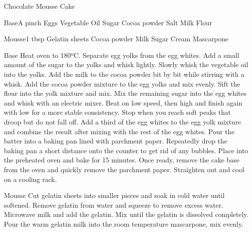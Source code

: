 \documentclass[10pt, a4paper]{article}
\begin{document}
	\begin{recipe}{Chocolate Mousse Cake}
		\begin{ingredients}[2]
			\begin{ingredientgroup}{Base}{A pinch}
				 Eggs
				 Vegetable Oil
				 Sugar
				 Cocoa powder
				 Salt
				 Milk
				 Flour
			\end{ingredientgroup}
			\begin{ingredientgroup}{Mousse}{1 tbsp}
				 Gelatin sheets
				 Cocoa powder
				 Milk
				 Sugar
				 Cream
				 Mascarpone
			\end{ingredientgroup}
		\end{ingredients}
		\begin{procedure}
			\begin{proceduregroup}{Base}
				\step Heat oven to 180ºC.
				\step Separate egg yolks from the egg whites.
				\step Add a small amount of the sugar to the yolks and whisk lightly.
				\step Slowly whisk the vegetable oil into the yolks.
				\step Add the milk to the cocoa powder bit by bit while stirring with a whisk.
				\step Add the cocoa powder mixture to the egg yolks and mix evenly.
				\step Sift the flour into the yolk mixture and mix.
				\step Mix the remaining sugar into the egg whites and whisk with an electric mixer. Beat on low speed, then high and finish again with low for a more stable consistency. Stop when you reach soft peaks that droop but do not fall off.
				\step Add a third of the egg whites to the egg yolk mixture and combine the result after mixing with the rest of the egg whites.
				\step Pour the batter into a baking pan lined with parchment paper. Repeatedly drop the baking pan a short distance onto the counter to get rid of any bubbles.
				\step Place into the preheated oven and bake for 15 minutes.
				\step Once ready, remove the cake base from the oven and quickly remove the parchment paper. Straighten out and cool on a cooling rack.
			\end{proceduregroup}
			\begin{proceduregroup}{Mousse}
				\step Cut gelatin sheets into smaller pieces and soak in cold water until softened.
				\step Remove gelatin from water and squeeze to remove excess water.
				\step Microwave milk and add the gelatin. Mix until the gelatin is dissolved completely.
				\step Pour the warm gelatin milk into the room temperature mascarpone, mix evenly.

\end{proceduregroup}
\end{procedure}
\end{recipe}
\end{document}
